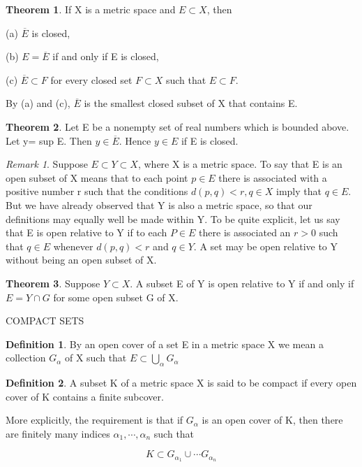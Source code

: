 \documentclass{article}
\theoremstyle{definition}
\newtheorem{defi}{Definition}
\newtheorem{theo}{Theorem}
\theoremstyle{remark}
\newtheorem{Rem}{Remark}
\begin{document}
	\begin{theo}
		If X is a metric space and $E\subset X$, then
		
		(a) $\overline{E}$ is closed,
		
		(b) $E=\overline{E}$ if and only if E is closed,
		
		(c) $\overline{E}\subset F$ for every closed set $F\subset X$ such that $E\subset F$.
		
	\end{theo}
	
	By (a) and (c), $\overline{E}$ is the smallest closed subset of X that contains E.
	
	\begin{theo}
		Let E be a nonempty set of real numbers which is bounded above. Let y= sup E. Then $y\in\overline{E}.$ Hence $y\in E$ if E is closed. 
	\end{theo}
	
	\begin{Rem}
		Suppose $E\subset Y\subset X$, where X is a metric space. To say that E is an open subset of X means that to each point $p\in E$ there is associated with a positive number r such that the conditions $d(p,q)<r, q\in X$ imply that $q\in E$. But we have already observed that Y is also a metric space, so that our definitions may equally well be made within Y. To be quite explicit, let us say that E is open relative to Y if to each $P\in E$ there is associated an $r>0$ such that $q\in E$ whenever $d(p,q)<r$ and $q\in Y$. A set may be open relative to Y without being an open subset of X.
		
	\end{Rem}
	
	\begin{theo}
		Suppose $Y\subset X$. A subset E of Y is open relative to Y if and only if $E=Y\cap G$ for some open subset G of X.
	\end{theo}
	
	\newpage
	
	COMPACT SETS
	
	\begin{defi}
		By an open cover of a set E in a metric space X we mean a collection ${G_\alpha}$ of X such that $E\subset \bigcup_\alpha G_\alpha$
	\end{defi}
	
	\begin{defi}
		A subset K of a metric space X is said to be compact if every open cover of K contains a finite subcover.
		
		More explicitly, the requirement is that if ${G_\alpha}$ is an open cover of K, then there are finitely many indices $\alpha_1,\cdots,\alpha_n$ such that
		
		\[
		K\subset G_{\alpha_1}\cup\cdots G_{\alpha_n}
		\]
		
	\end{defi}
	
\end{document}
